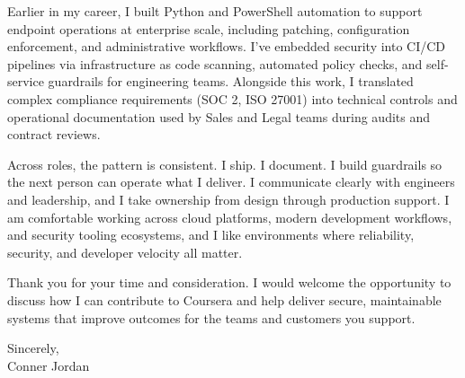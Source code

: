 \documentclass[letterpaper,11pt]{article}
\begin{document}
\vspace{16pt}

Earlier in my career, I built Python and PowerShell automation to support endpoint operations at enterprise scale, including patching, configuration enforcement, and administrative workflows. I’ve embedded security into CI/CD pipelines via infrastructure as code scanning, automated policy checks, and self-service guardrails for engineering teams. Alongside this work, I translated complex compliance requirements (SOC 2, ISO 27001) into technical controls and operational documentation used by Sales and Legal teams during audits and contract reviews.

\vspace{16pt}

Across roles, the pattern is consistent. I ship. I document. I build guardrails so the next person can operate what I deliver. I communicate clearly with engineers and leadership, and I take ownership from design through production support. I am comfortable working across cloud platforms, modern development workflows, and security tooling ecosystems, and I like environments where reliability, security, and developer velocity all matter.

\vspace{16pt}

Thank you for your time and consideration. I would welcome the opportunity to discuss how I can contribute to Coursera and help deliver secure, maintainable systems that improve outcomes for the teams and customers you support.

\vspace{16pt}

Sincerely,\\
Conner Jordan
\end{document}
